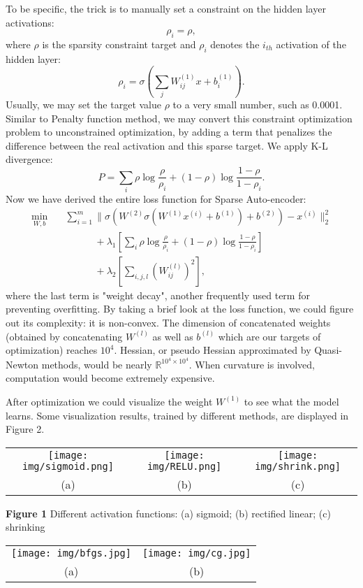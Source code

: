\documentclass{article} %
\begin{document}
To be specific, the trick is to manually set a constraint on the hidden layer activations:
$$
\rho_i = \rho,
$$
where $\rho$ is the sparsity constraint target and $\rho_i$ denotes the $i_{th}$ activation of the hidden layer:
$$
\rho_i = \sigma(\sum_j W_{ij}^{(1)} x + b_i^{(1)} ).
$$
Usually, we may set the target value $\rho$ to a very small number, such as 0.0001. Similar to Penalty function method, we may convert this constraint optimization problem to unconstrained optimization, by adding a term that penalizes the difference between the real activation and this sparse target. We apply K-L divergence:
$$
P = \sum_i{\rho \log \frac{\rho}{\rho_i} + (1-\rho) \log \frac{1-\rho}{1-\rho_i} }.
$$
Now we have derived the entire loss function for Sparse Auto-encoder: 
\begin{align*}
\min_{W, b} \quad & \sum_{i=1}^m \|	 \sigma( W^{(2)} \sigma( W^{(1)} x^{(i)}+b^{(1)} )+b^{(2)} )-x^{(i)} \|_2^2 \\
&\quad \quad \quad  + \lambda_1 [\sum_i{\rho \log \frac{\rho}{\rho_i} + (1-\rho) \log \frac{1-\rho}{1-\rho_i} }] \\
& \quad \quad \quad + \lambda_2 [\sum_{i,j,l} (W_{ij}^{(l)})^2],
\end{align*}
where the last term is "weight decay", another frequently used term for preventing overfitting. By taking a brief look at the loss function, we could figure out its complexity: it is non-convex. The dimension of concatenated weights (obtained by concatenating $W^{(l)}$ as well as $b^{(l)}$ which are our targets of optimization) reaches $10^4$. Hessian, or pseudo Hessian approximated by Quasi-Newton methods, would be nearly $\mathbb{R}^{10^4 \times 10^4}$. When curvature is involved, computation would become extremely expensive.

After optimization we could visualize the weight $W^{(1)}$ to see what the model learns. Some visualization results, trained by different methods, are displayed in Figure 2.\\
\begin{tabular}{ccc}
    \texttt{[image: img/sigmoid.png]}  &
    \texttt{[image: img/RELU.png]} &
    \texttt{[image: img/shrink.png]} \\
    (a) & (b) & (c)
\end{tabular}
{\bf Figure 1} Different activation functions: (a) sigmoid; (b) rectified linear; (c) shrinking

\begin{tabular}{cc}
    \texttt{[image: img/bfgs.jpg]}  &
    \texttt{[image: img/cg.jpg]} \\
    (a) & (b)
\end{tabular}
\end{document}
